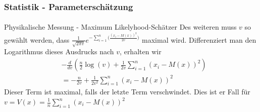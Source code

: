 \documentclass{beamer}
\begin{document}
\begin{frame}
    \frametitle{Statistik - Parameterschätzung}
\framesubtitle{}
\begin{block}{Physikalische Messung - Maximum Likelyhood-Schätzer}
Des weiteren muss $v$ so gewählt werden, dass $ \frac {1}{ \sqrt{2 \pi v }} e^{- \sum_{i=1}^n \bigl( \frac{(x_i- M(x))^2}{ 2v} \bigr)}$ maximal wird. Differenziert man den Logarithmus dieses Ausdrucks nach $v$, erhalten wir
\begin{align*}
& -\frac{d}{dv} (\frac{n}{2} \log(v) + \frac{1}{2v} \sum_{i=1}^n (x_i - M(x))^2 ) \\
& = -\frac{n}{2v} + \frac{1}{2v^2}\sum_{i=1}^n (x_i - M(x))^2 
\end{align*}
Dieser Term ist maximal, falls der letzte Term verschwindet. Dies ist er Fall für
$v = V(x) =\frac{1}{n}\sum_{i=1}^n (x_i - M(x))^2$
\end{block}

 \end{frame}
\end{document}
